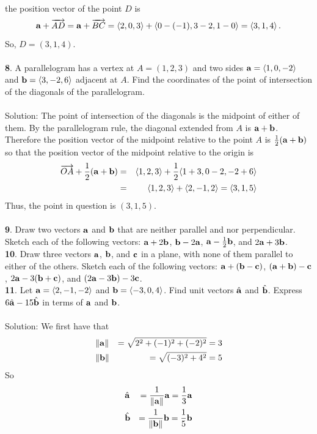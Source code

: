 \documentclass[12pt]{amsbook}
\newcommand{\la}{\langle}
\newcommand{\ra}{\rangle}
\begin{document}
the position vector of the point $D$
is 
$$
{\bf a}+\overrightarrow{AD}={\bf a}+\overrightarrow{BC}=
\langle 2,0,3\rangle+\langle 0-(-1), 3-2, 1-0\rangle=
\langle 3,1,4\rangle\,.
$$
So, $D=(3,1,4)$. \\
\\
{\small\bf 8}. A parallelogram has a vertex at $A=(1,2,3)$ and 
two sides ${\bf a}=\la 1,0,-2\ra$ and ${\bf b}=\la 3,-2, 6\ra$ adjacent
at $A$. Find the coordinates of the point of intersection 
of the diagonals of the parallelogram.\\
\\
{\sc Solution}: The point of intersection of the diagonals is the midpoint
of either of them. By the parallelogram rule, the diagonal extended from 
$A$ is ${\bf a}+{\bf b}$. Therefore the position vector of the midpoint 
relative to the point $A$ is $\frac 12({\bf a}+{\bf b})$ so that the position 
vector of the midpoint relative to the origin is 
\begin{eqnarray*}
\overrightarrow{OA}+\frac 12({\bf a}+{\bf b})&=&
\langle 1,2,3\rangle+\frac 12\langle 1+3,0-2,-2+6\rangle\\
&=&
\langle 1,2,3\rangle +\langle 2,-1,2\rangle =\langle 3,1,5\rangle
\end{eqnarray*}
Thus, the point in question is $(3,1,5)$.\\
\\ 
{\small\bf 9}. Draw two vectors ${\bf a}$ and ${\bf b}$ 
that are neither parallel and nor perpendicular. 
Sketch each of the following vectors:
${\bf a}+2{\bf b}$, ${\bf b}-2{\bf a}$, ${\bf a}-\frac 12{\bf b}$,
 and $2{\bf a}+3{\bf b}$.\\ 
{\small\bf 10}. Draw three vectors ${\bf a}$, ${\bf b}$, and ${\bf c}$
in a plane, with none of them parallel to
either of the others. Sketch each of the following vectors:
${\bf a}+({\bf b}-{\bf c})$, $({\bf a}+{\bf b})-{\bf c}$, 
$2{\bf a}-3({\bf b}+{\bf c})$, and 
$(2{\bf a}-3{\bf b})-3{\bf c}$.\\
{\small\bf 11}. Let ${\bf a}=\la 2,-1,-2\ra$ and 
${\bf b}=\la -3,0,4\ra$. Find unit vectors
$\hat{\bf a}$ and $\hat{\bf b}$. Express
$6\hat{\bf a}-15\hat{\bf b}$ in terms of ${\bf a}$
and ${\bf b}$.\\
\\
{\sc Solution}:
We first have that
\begin{eqnarray*}
&\|\bf a\|&=\sqrt{2^2+(-1)^2+(-2)^2}=3 \\
&\|\bf b\|&=\sqrt{(-3)^2+4^2}=5
\end{eqnarray*}
So
\begin{eqnarray*}
&\hat{\bf a}&=\frac {1}{\|\bf a \|} {\bf a}= \frac 13 {\bf a}  \\
&\hat{\bf b}&=\frac {1}{\|\bf b \|} {\bf b}= \frac 15 {\bf b}
\end{eqnarray*}
\end{document}
